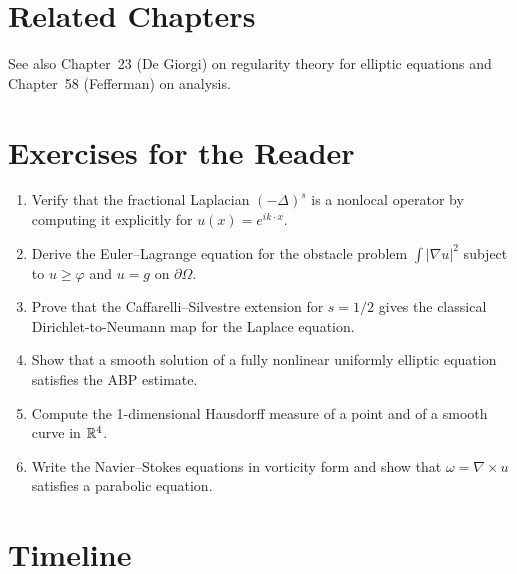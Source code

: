 \section{Related Chapters}
See also Chapter~23 (De Giorgi) on regularity theory for elliptic equations and Chapter~58 (Fefferman) on analysis.

\section*{Exercises for the Reader}

\begin{enumerate}
    \item [B] Verify that the fractional Laplacian $(-\Delta)^s$ is a nonlocal operator by computing it explicitly for $u(x) = e^{ik\cdot x}$.
    \item [B] Derive the Euler--Lagrange equation for the obstacle problem $\int |\nabla u|^2$ subject to $u \geq \varphi$ and $u = g$ on $\partial\Omega$.
    \item [I] Prove that the Caffarelli--Silvestre extension for $s = 1/2$ gives the classical Dirichlet-to-Neumann map for the Laplace equation.
    \item [I] Show that a smooth solution of a fully nonlinear uniformly elliptic equation satisfies the ABP estimate.
    \item [B] Compute the 1-dimensional Hausdorff measure of a point and of a smooth curve in $\mathbb{R}^4$.
    \item [B] Write the Navier--Stokes equations in vorticity form and show that $\omega = \nabla \times u$ satisfies a parabolic equation.
\end{enumerate}

\section*{Timeline}

